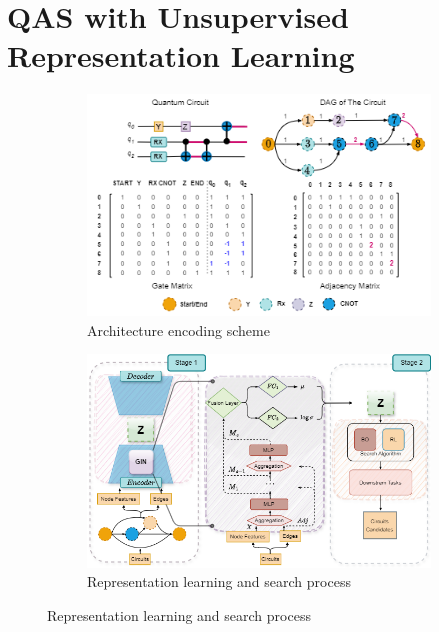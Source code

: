 \documentclass{article} %
\begin{document}
\section{QAS with Unsupervised Representation Learning}
%     
\begin{figure}[ht]
\begin{center}
    \centering
    \begin{subfigure}{0.45\linewidth}
    \includegraphics[width = \linewidth]{images/encoding3.drawio.png} %
    \caption{Architecture encoding scheme}
    \label{algorithm-1}
    \end{subfigure}
    \hfill
    \begin{subfigure}{0.5\linewidth}
    \includegraphics[width = \linewidth]{images/algo_test_2.drawio.png} %
    \caption{Representation learning and search process}
    \label{algorithm-2}
    \end{subfigure}


\end{center}
\end{figure}
\end{document}

